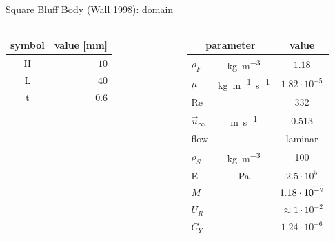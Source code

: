 \documentclass[10pt,t]{beamer}
\begin{document}
\begin{frame}{Square Bluff Body (Wall 1998): domain}
\begin{columns}
    	\scriptsize
		\begin{tabular}{ c | r } 
			symbol & value [\si{mm}]  \\ 
			\hline
			H & $10$     \\
			L & $40$  \\
			t & $0.6$  \\			
		\end{tabular}

		\vspace{1.5cm}
		\begin{tabular}{ l c  | c } 
			\multicolumn{2}{c|}{parameter} & value  \\ 
			\hline
			$\rho_F$ & \si{kg.m^{-3}} & \cellcolor{blue!20} $1.18$   \\
			$\mu$& \si{kg.m^{-1}.s^{-1}} & \cellcolor{blue!20} $1.82 \cdot 10^{-5}$  \\
			Re &  & \cellcolor{blue!20} $332$ \\
			$\vec{u}_{\infty}$ & \si{m.s^{-1}} & \cellcolor{blue!20} $0.513$ \\
			flow & & \cellcolor{blue!20} laminar \\
			\hline
			$\rho_S$ & \si{kg.m^{-3}} & \cellcolor{orange!50} 100    \\
			E & \si{Pa} & \cellcolor{orange!50} $2.5\cdot 10^5$    \\
			\hline
			$M$ & & $ \cellcolor{green!10} 1.18\cdot 10^{-2}$     \\
			\hline
			$U_R$ & & $ \approx 1\cdot 10^{-2}$  \\
			$C_Y$ & & $  1.24 \cdot 10^{-6}$  \\			

		\end{tabular}
\end{columns}
\end{frame}
\end{document}
